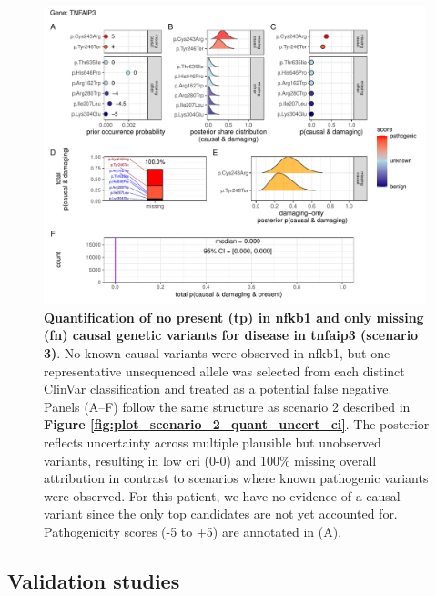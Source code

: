 \begin{figure}[h]
  \centering
  \includegraphics[width=0.99\textwidth]{../images/plot_scenario_3_quant_uncert_ci.pdf}
  \caption{
 \textbf{Quantification of no present (\ac{tp}) in \ac{nfkb1} and only missing (\ac{fn}) causal genetic variants for disease in \ac{tnfaip3} (scenario 3)}.
No known causal variants were observed in \ac{nfkb1}, but one representative unsequenced allele was selected from each distinct ClinVar classification and treated as a potential false negative.  
Panels (A–F) follow the same structure as scenario 2 described in \textbf{Figure \ref{fig:plot_scenario_2_quant_uncert_ci}}.  
The posterior reflects uncertainty across multiple plausible but unobserved variants, resulting in low \ac{cri} (0-0) and 100\% missing overall attribution in contrast to scenarios where known pathogenic variants were observed. For this patient, we have no evidence of a causal variant since the only top candidates are not yet accounted for.
Pathogenicity scores (-5 to +5) are annotated in (A).
  }
  \label{fig:plot_scenario_3_quant_uncert_ci}
\end{figure}

\FloatBarrier
\clearpage











\subsection{Validation studies}
